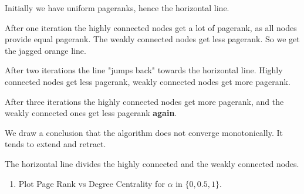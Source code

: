 \documentclass[11pt]{article}
\providecommand{\tightlist}{%
      \setlength{\itemsep}{0pt}\setlength{\parskip}{0pt}}
\begin{document}
    Initially we have uniform pageranks, hence the horizontal line.

After one iteration the highly connected nodes get a lot of pagerank, as
all nodes provide equal pagerank. The weakly connected nodes get less
pagerank. So we get the jagged orange line.

After two iterations the line "jumps back" towards the horizontal line.
Highly connected nodes get less pagerank, weakly connected nodes get
more pagerank.

After three iterations the highly connected nodes get more pagerank, and
the weakly connected ones get less pagerank \textbf{again}.

We draw a conclusion that the algorithm does not converge monotonically.
It tends to extend and retract.

The horizontal line divides the highly connected and the weakly
connected nodes.

    \begin{enumerate}
\def\labelenumi{\alph{enumi})}
\setcounter{enumi}{4}
\tightlist
\item
  Plot Page Rank vs Degree Centrality for \(\alpha\) in \(\{0,0.5,1\}\).
\end{enumerate}
\end{document}
